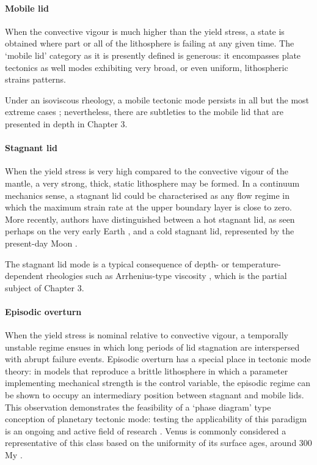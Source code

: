 \documentclass[a4paper,11pt,oneside]{book}
\begin{document}
\paragraph{Mobile lid}

When the convective vigour is much higher than the yield stress, a state is obtained where part or all of the lithosphere is failing at any given time. The `mobile lid' category as it is presently defined is generous: it encompasses plate tectonics as well modes exhibiting very broad, or even uniform, lithospheric strains patterns.

Under an isoviscous rheology, a mobile tectonic mode persists in all but the most extreme cases \cite{Blankenbach1989-li}; nevertheless, there are subtleties to the mobile lid that are presented in depth in Chapter 3.

\paragraph{Stagnant lid}

When the yield stress is very high compared to the convective vigour of the mantle, a very strong, thick, static lithosphere may be formed. In a continuum mechanics sense, a stagnant lid could be characterised as any flow regime in which the maximum strain rate at the upper boundary layer is close to zero. More recently, authors have distinguished between a hot stagnant lid, as seen perhaps on the very early Earth \citet{Debaille2013-df, ONeill2014-vk}, and a cold stagnant lid, represented by the present-day Moon \cite{Weller2015-ci}.

The stagnant lid mode is a typical consequence of depth- or temperature-dependent rheologies such as Arrhenius-type viscosity \cite{Davaille1993-hv}, which is the partial subject of Chapter 3.

\paragraph{Episodic overturn}

When the yield stress is nominal relative to convective vigour, a temporally unstable regime ensues in which long periods of lid stagnation are interspersed with abrupt failure events. Episodic overturn has a special place in tectonic mode theory: in models that reproduce a brittle lithosphere \cite{Moresi1998-az} in which a parameter implementing mechanical strength is the control variable, the episodic regime can be shown to occupy an intermediary position between stagnant and mobile lids. This observation demonstrates the feasibility of a `phase diagram' type conception of planetary tectonic mode: testing the applicability of this paradigm is an ongoing and active field of research \citet{Driscoll2013-ex, Weller2015-ci}. Venus is commonly considered a representative of this class based on the uniformity of its surface ages, around 300 My \cite{Turcotte1999-ne}.
\end{document}
